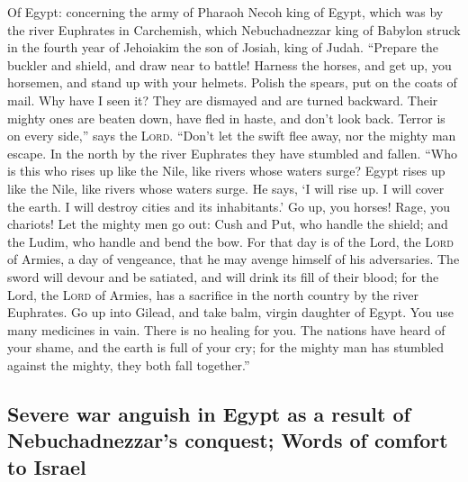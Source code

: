  Of Egypt: concerning the army of Pharaoh Necoh king of
Egypt, which was by the river Euphrates in Carchemish, which
Nebuchadnezzar king of Babylon struck in the fourth year of Jehoiakim
the son of Josiah, king of Judah.  ``Prepare the buckler
and shield, and draw near to battle!  Harness the horses,
and get up, you horsemen, and stand up with your helmets. Polish the
spears, put on the coats of mail.  Why have I seen it?
They are dismayed and are turned backward. Their mighty ones are beaten
down, have fled in haste, and don't look back. Terror is on every
side,'' says the \textsc{Lord}.  ``Don't let the swift
flee away, nor the mighty man escape. In the north by the river
Euphrates they have stumbled and fallen.  ``Who is this
who rises up like the Nile, like rivers whose waters surge?
 Egypt rises up like the Nile, like rivers whose waters
surge. He says, `I will rise up. I will cover the earth. I will destroy
cities and its inhabitants.'  Go up, you horses! Rage, you
chariots! Let the mighty men go out: Cush and Put, who handle the
shield; and the Ludim, who handle and bend the bow.  For
that day is of the Lord, the \textsc{Lord} of Armies, a day of
vengeance, that he may avenge himself of his adversaries. The sword will
devour and be satiated, and will drink its fill of their blood; for the
Lord, the \textsc{Lord} of Armies, has a sacrifice in the north country
by the river Euphrates.  Go up into Gilead, and take
balm, virgin daughter of Egypt. You use many medicines in vain. There is
no healing for you.  The nations have heard of your
shame, and the earth is full of your cry; for the mighty man has
stumbled against the mighty, they both fall together.''

\hypertarget{severe-war-anguish-in-egypt-as-a-result-of-nebuchadnezzars-conquest-words-of-comfort-to-israel}{%
\subsection{Severe war anguish in Egypt as a result of Nebuchadnezzar's
conquest; Words of comfort to
Israel}\label{severe-war-anguish-in-egypt-as-a-result-of-nebuchadnezzars-conquest-words-of-comfort-to-israel}}

